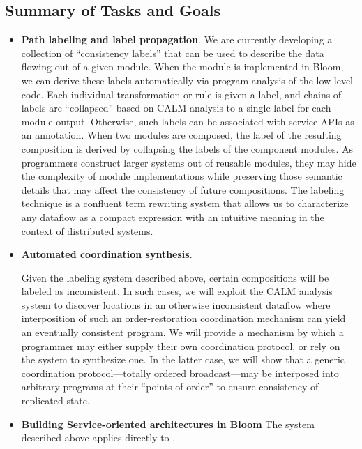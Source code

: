 \subsection{Summary of Tasks and Goals}


\begin{itemize}
\item \textbf{Path labeling and label propagation}.
We are currently developing a collection of ``consistency labels'' that 
can be used to describe the data flowing out of a given module.  When the module
is implemented in Bloom, we can derive these labels automatically via program
analysis of the low-level code.  Each individual transformation or rule is 
given a label, and chains of labels are ``collapsed'' based on CALM analysis to 
a single label for each module output.  
Otherwise, such labels can be associated with service APIs as an annotation.  
When two modules are composed, the label of the resulting composition is derived
by collapsing the labels of the component modules.
As programmers construct larger systems out of reusable modules, they may 
hide the complexity of module implementations while preserving those semantic 
details that may affect the consistency of future compositions. The 
labeling technique is a confluent term rewriting system that allows us to 
characterize any dataflow as a compact expression with an intuitive 
meaning in the context of distributed systems.

\item \textbf{Automated coordination synthesis}.

Given the labeling system described above, certain compositions will be 
labeled as inconsistent.  In such cases, we will exploit the CALM
analysis system to discover locations in an otherwise 
inconsistent dataflow where interposition of such an order-restoration 
coordination mechanism can yield an eventually consistent program.
We will provide a mechanism by which a programmer may either supply 
their own coordination protocol, or rely on the system to synthesize one. 
In the latter case, we will show that a generic coordination 
protocol---totally ordered broadcast---may be interposed into arbitrary 
programs at their ``points of order''
to ensure consistency of replicated state.

\item \textbf{Building Service-oriented architectures in Bloom}
The system described above applies directly to .
\end{itemize}

